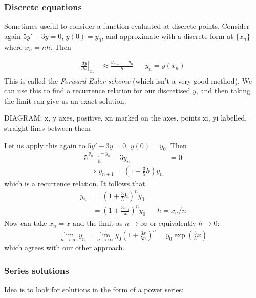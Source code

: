 \documentclass{../template/note}
\begin{document}
    \subsubsection{Discrete equations}

    Sometimes useful to consider a function evaluated at discrete points. Consider again \(5y' - 3y = 0\), \(y(0) = y_0\), and approximate with a discrete form at \(\{x_n\}\) where \(x_n = nh\). Then

    \begin{align*}
        \left.\frac{dy}{dx}\right|_{x_n} &\approx \frac{y_{n+1}-y_n}{h} && y_n = y(x_n)
    \end{align*}
    This is called the \emph{Forward Euler scheme} (which isn't a very good method). We can use this to find a recurrence relation for our discretised \(y\), and then taking the limit can give us an exact solution.

    DIAGRAM: x, y axes, positive, xn marked on the axes, points xi, yi labelled, straight lines between them

    \begin{example}
        Let us apply this again to \(5y'-3y=0\), \(y(0) = y_0\). 
        Then
        \begin{align*}
            5 \frac{y_{n+1}-y_n}{h} - 3y_n &= 0 \\
            \implies y_{n+1} = \left(1 + \frac{3}{5}h\right)y_n
        \end{align*}
        which is a recurrence relation. It follows that
        \begin{align*}
            y_n &= \left(1 + \frac{3}{5}h\right)^n y_0 \\
            &= \left(1 + \frac{3x_n}{5n}\right)^n y_0 && h = x_n/n
        \end{align*}
        Now can take \(x_n = x\) and the limit as \(n \to \infty\) or equivalently \(h \to 0\):
        \begin{align*}
            \lim_{n \to \infty} y_n = \lim_{n \to \infty} y_0 \left( 1 + \frac{3x}{5n} \right)^n = y_0 \exp\left(\frac{3}{5}x\right)
        \end{align*}
        which agrees with our other approach.
    \end{example}
    
    
    \subsubsection{Series solutions}

    Idea is to look for solutions in the form of a power series:
\end{document}
